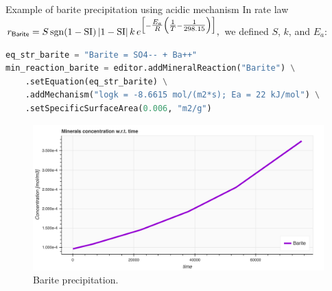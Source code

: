 \begin{frame}[fragile]{Example of barite precipitation using acidic mechanism}
	\small 
		In rate law $r_{\sf Barite} = S \, {\rm sgn}(1-\mathrm{SI})\, |1-\mathrm{SI}| \, 
		k \, e^{\Big[-\tfrac{E_a}{R}\Big(\tfrac{1}{T}-\tfrac{1}{298.15}\Big)\Big]},$ 
		we defined 
		$S$, $k$, and $E_a$:\\[10pt]	
\begin{lstlisting}[language=Python, caption=Define barite mineral reaction and its parameters]
eq_str_barite = "Barite = SO4-- + Ba++"
min_reaction_barite = editor.addMineralReaction("Barite") \
	.setEquation(eq_str_barite) \
	.addMechanism("logk = -8.6615 mol/(m2*s); Ea = 22 kJ/mol") \
	.setSpecificSurfaceArea(0.006, "m2/g")
\end{lstlisting}
	\begin{figure}
		\centering
		\includegraphics[height=0.37\textheight]{figures/chemical-kinetics/barite-acidic-mechanism.png}
		\caption*{Barite precipitation.}
	\end{figure}
\end{frame}
%
%
%	
%		
